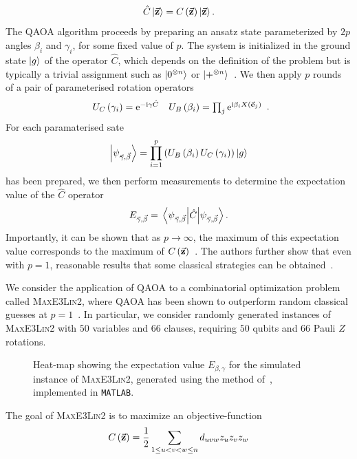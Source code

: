 \[\hat{C}\ket{\va{z}}=C\left(\va{z}\right)\ket{\va{z}}.\]
The QAOA algorithm proceeds by preparing an ansatz state parameterized by $2p$ angles $\beta_{i}$ and $\gamma_{i}$, for some fixed value of $p$. The system is initialized in the ground state $\ket{g}$ of the operator $\hat{C}$, which depends on the definition of the problem but is typically a trivial assignment such as $\ket{0^{\otimes n}}$ or $\ket{+^{\otimes n}}$~\cite{Farhi2014,Farhi2014b}. We then apply $p$ rounds of a pair of parameterised rotation operators
\[\begin{array}{lr}
U_{C}\left(\gamma_{i}\right)=\mathrm{e}^{-\mathrm{i} \gamma \hat{C}} &  U_{B}\left(\beta_{i}\right) = \prod_{j}\mathrm{e}^{\mathrm{i}\beta_{i} X(\va{e}_{j})}
\end{array}.\]
For each paramaterised sate 
\[\ket{\psi_{\va{\gamma},\va{\beta}}}=\prod_{i=1}^{p}\left(U_{B}\left(\beta_{i}\right)U_{C}\left(\gamma_{i}\right)\right)\ket{g}\]
has been prepared, we then perform measurements to determine the expectation value of the $\hat{C}$ operator 
\[E_{\va{\gamma},\va{\beta}}=\matrixel{\psi_{\va{\gamma},\va{\beta}}}{\hat{C}}{\psi_{\va{\gamma},\va{\beta}}}.\]
Importantly, it can be shown that as $p\rightarrow \infty$, the maximum of this expectation value corresponds to the maximum of $C\left(\va{z}\right)$~\cite{Farhi2014}. The authors further show that even with $p=1$, reasonable results that some classical strategies can be obtained~\cite{Farhi2014,Farhi2014b}.\par
We consider the application of QAOA to a combinatorial optimization problem called \textsc{MaxE3Lin2}, where QAOA has been shown to outperform random classical guesses at $p=1$~\cite{Farhi2014b}. In particular, we consider randomly generated instances of \textsc{MaxE3Lin2} with $50$ variables and $66$ clauses, requiring $50$ qubits and $66$ Pauli $Z$ rotations.\par
\begin{figure}[t]
\centering
\begin{scaletikzpicturetowidth}{0.65\textwidth}

\end{scaletikzpicturetowidth}
\caption{Heat-map showing the expectation value $E_{\beta,\gamma}$ for the simulated instance of \textsc{MaxE3Lin2}, generated using the method of~\cite{VandenNest2009}, implemented in \texttt{MATLAB}.}\label{fig:mc_qaoa}
\end{figure}
The goal of \textsc{MaxE3Lin2} is to maximize an objective-function
\[C\left(\va{z}\right) = \frac{1}{2}\sum_{1\leq u < v < w \leq n} d_{uvw}z_{u}z_{v}z_{w}\]
